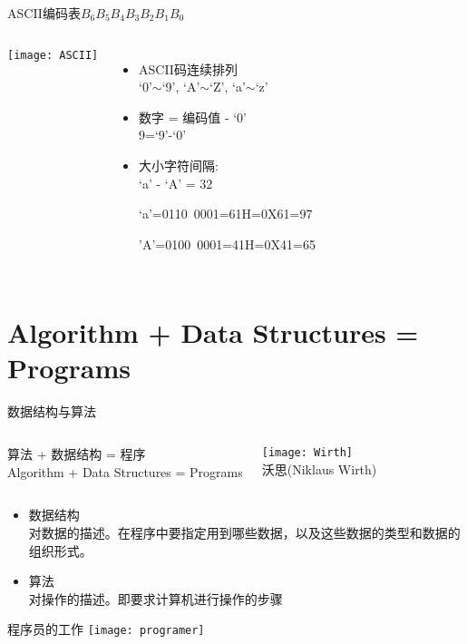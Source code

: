\begin{frame}{ASCII编码表$B_6B_5B_4B_3B_2B_1B_0$}
\begin{columns}
	\texttt{[image: ASCII]}
	\begin{itemize}
		\item ASCII码连续排列 \\
		 `0'$\sim$`9', `A'$\sim$`Z', `a'$\sim$`z'
		\item 数字 = 编码值 - `0' \\
		 9=`9'-`0'
		\item 大小字符间隔: \\
		`a' - `A' = 32
		
		\scriptsize{
		`a'=0110~0001=61H=0X61=97
		
		'A'=0100~0001=41H=0X41=65}
	\end{itemize}	
\end{columns}
\end{frame}


\section{Algorithm + Data Structures = Programs}

\begin{frame}{数据结构与算法}
\begin{columns}
	\begin{block}{}
		算法 + 数据结构 = 程序\\
		Algorithm + Data Structures = Programs
	\end{block}
	\texttt{[image: Wirth]}\\
	沃思(Niklaus Wirth)
\end{columns}
\begin{itemize}
	\item 数据结构\\
	对数据的描述。在程序中要指定用到哪些数据，以及这些数据的类型和数据的组织形式。
	\item 	算法\\
	对操作的描述。即要求计算机进行操作的步骤	
\end{itemize}
\end{frame}

\begin{frame}{程序员的工作}
\centering
\texttt{[image: programer]}
\end{frame}

